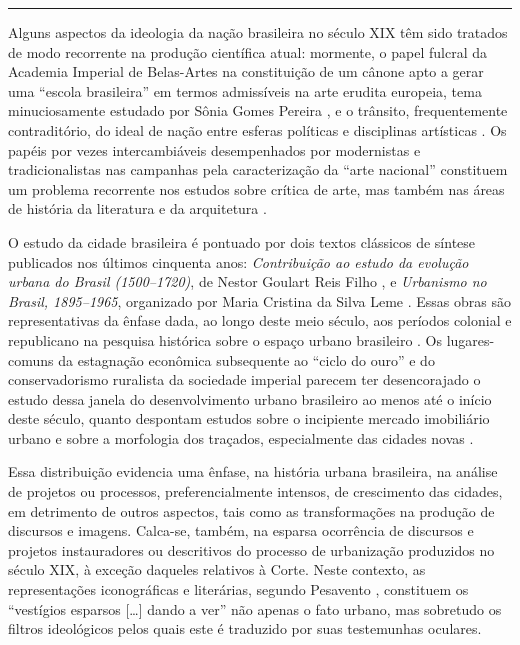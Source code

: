 \begin{center}\rule{0.5\linewidth}{0.5pt}\end{center}

Alguns aspectos da ideologia da nação brasileira no século XIX têm sido
tratados de modo recorrente na produção científica atual: mormente, o
papel fulcral da Academia Imperial de Belas-Artes na constituição de um
cânone apto a gerar uma ``escola brasileira'' em termos admissíveis na
arte erudita europeia, tema minuciosamente estudado por Sônia Gomes
Pereira \autocite{pereira:2012revisao}, e o trânsito, frequentemente
contraditório, do ideal de nação entre esferas políticas e disciplinas
artísticas \autocite{abreu:2001museu}. Os papéis por vezes
intercambiáveis desempenhados por modernistas e tradicionalistas nas
campanhas pela caracterização da ``arte nacional'' constituem um
problema recorrente nos estudos sobre crítica de arte, mas também nas
áreas de história da literatura e da arquitetura
\autocite{lins:1996gonzaga25,thiengo:2010questao,wisnik:2007plastica}.

O estudo da cidade brasileira é pontuado por dois textos clássicos de
síntese publicados nos últimos cinquenta anos: \emph{Contribuição ao
estudo da evolução urbana do Brasil (1500--1720)}, de Nestor Goulart
Reis Filho \autocite*{reisfilho:1968contribuicao}, e \emph{Urbanismo no
Brasil, 1895--1965}, organizado por Maria Cristina da Silva Leme
\autocite*{leme:2005urbanismo}. Essas obras são representativas da
ênfase dada, ao longo deste meio século, aos períodos colonial e
republicano na pesquisa histórica sobre o espaço urbano brasileiro
\autocite{fernandes:2004historia}. Os lugares-comuns da estagnação
econômica subsequente ao ``ciclo do ouro'' e do conservadorismo
ruralista da sociedade imperial parecem ter desencorajado o estudo dessa
janela do desenvolvimento urbano brasileiro ao menos até o início deste
século, quanto despontam estudos sobre o incipiente mercado imobiliário
urbano \autocite{bueno:2005tecido} e sobre a morfologia dos traçados,
especialmente das cidades novas
\autocite{brazesilva:2012planejamento13,nogueira:2013analise}.

Essa distribuição evidencia uma ênfase, na história urbana brasileira,
na análise de projetos ou processos, preferencialmente intensos, de
crescimento das cidades, em detrimento de outros aspectos, tais como as
transformações na produção de discursos e imagens. Calca-se, também, na
esparsa ocorrência de discursos e projetos instauradores ou descritivos
do processo de urbanização produzidos no século XIX, à exceção daqueles
relativos à Corte. Neste contexto, as representações iconográficas e
literárias, segundo Pesavento \autocite*[ p.~665]{pesavento:2001busca},
constituem os ``vestígios esparsos {[}\ldots{]} dando a ver'' não apenas
o fato urbano, mas sobretudo os filtros ideológicos pelos quais este é
traduzido por suas testemunhas oculares.


